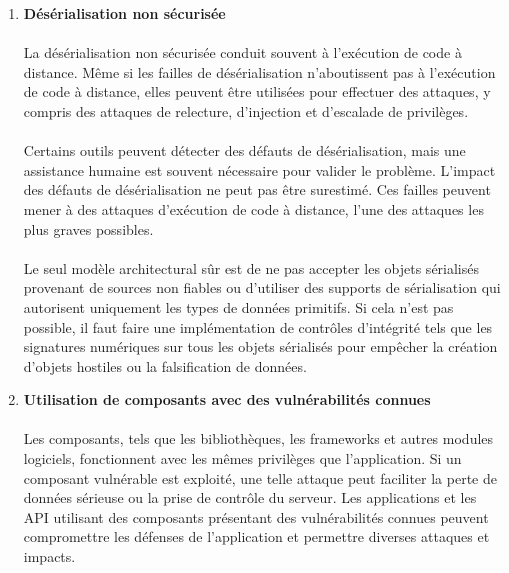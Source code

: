 \begin{enumerate}
	\vspace*{0.8cm} \item \textbf{Désérialisation non sécurisée} \vspace*{-0.4cm}
	\paragraph{}
	La désérialisation non sécurisée conduit souvent à l'exécution de code à distance. Même si les failles de désérialisation n'aboutissent pas à l'exécution de code à distance, elles peuvent être utilisées pour effectuer des attaques, y compris des attaques de relecture, d'injection et d'escalade de privilèges.
	\paragraph{}
	Certains outils peuvent détecter des défauts de désérialisation, mais une assistance humaine est souvent nécessaire pour valider le problème.
	L'impact des défauts de désérialisation ne peut pas être surestimé. Ces failles peuvent mener à des attaques d'exécution de code à distance, l'une des attaques les plus graves possibles.
	\paragraph{}
	Le seul modèle architectural sûr est de ne pas accepter les objets sérialisés provenant de sources non fiables ou d'utiliser des supports de sérialisation qui autorisent uniquement les types de données primitifs. Si cela n'est pas possible, il faut faire une implémentation de contrôles d'intégrité tels que les signatures numériques sur tous les objets sérialisés pour empêcher la création d'objets hostiles ou la falsification de données.

	\vspace*{0.8cm} \item \textbf{Utilisation de composants avec des vulnérabilités connues} \vspace*{-0.4cm}
	\paragraph{}
	Les composants, tels que les bibliothèques, les frameworks et autres modules logiciels, fonctionnent avec les mêmes privilèges que l'application. Si un composant vulnérable est exploité, une telle attaque peut faciliter la perte de données sérieuse ou la prise de contrôle du serveur. Les applications et les API utilisant des composants présentant des vulnérabilités connues peuvent compromettre les défenses de l'application et permettre diverses attaques et impacts.

\end{enumerate}
